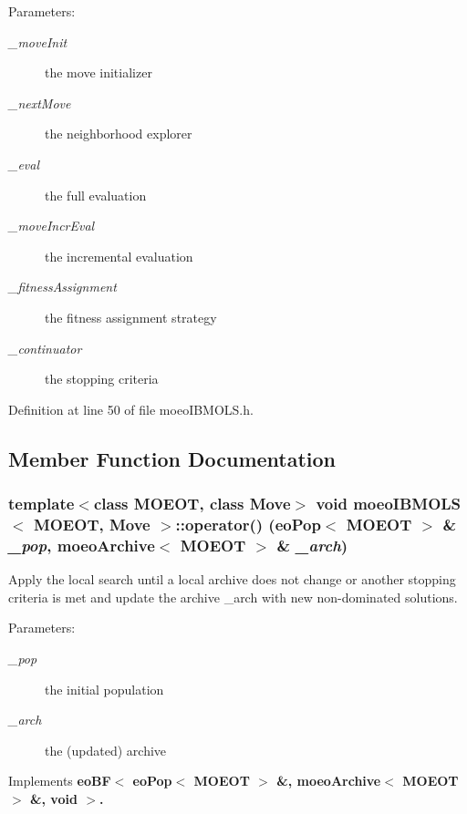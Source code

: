 \begin{Desc}
\item[Parameters:]
\begin{description}
\item[{\em \_\-move\-Init}]the move initializer \item[{\em \_\-next\-Move}]the neighborhood explorer \item[{\em \_\-eval}]the full evaluation \item[{\em \_\-move\-Incr\-Eval}]the incremental evaluation \item[{\em \_\-fitness\-Assignment}]the fitness assignment strategy \item[{\em \_\-continuator}]the stopping criteria \end{description}
\end{Desc}


Definition at line 50 of file moeo\-IBMOLS.h.

\subsection{Member Function Documentation}
\subsubsection{\setlength{\rightskip}{0pt plus 5cm}template$<$class MOEOT, class Move$>$ void \bf{moeo\-IBMOLS}$<$ MOEOT, Move $>$::operator() (\bf{eo\-Pop}$<$ MOEOT $>$ \& {\em \_\-pop}, \bf{moeo\-Archive}$<$ MOEOT $>$ \& {\em \_\-arch})\hspace{0.3cm}{\tt  [inline, virtual]}}\label{classmoeoIBMOLS_fd788bbc4f956dec932dba2a4d4479b6}


Apply the local search until a local archive does not change or another stopping criteria is met and update the archive \_\-arch with new non-dominated solutions. 

\begin{Desc}
\item[Parameters:]
\begin{description}
\item[{\em \_\-pop}]the initial population \item[{\em \_\-arch}]the (updated) archive \end{description}
\end{Desc}


Implements \bf{eo\-BF$<$ eo\-Pop$<$ MOEOT $>$ \&, moeo\-Archive$<$ MOEOT $>$ \&, void $>$}.


